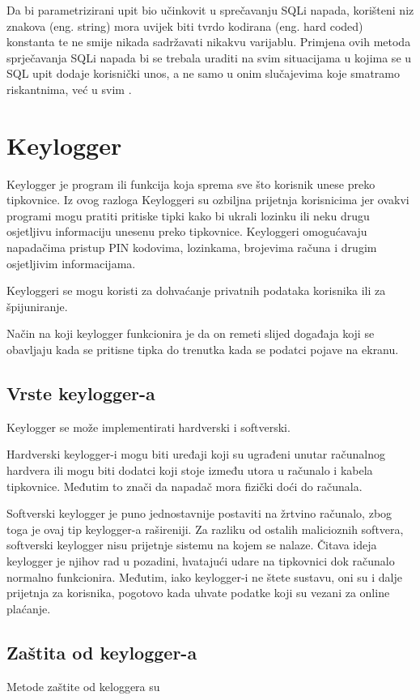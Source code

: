 \documentclass[12pt, oneside, onecolumn]{book}
\begin{document}
{Da bi parametrizirani upit bio učinkovit u sprečavanju SQLi napada, korišteni niz znakova (eng. string) mora uvijek biti tvrdo kodirana (eng. hard coded) konstanta te ne smije nikada sadržavati nikakvu varijablu. Primjena ovih metoda sprječavanja SQLi napada bi se trebala uraditi na svim situacijama u kojima se u SQL upit dodaje korisnički unos, a ne samo u onim slučajevima koje smatramo riskantnima, već u svim \cite{sitesqli}.

\section{Keylogger}
Keylogger je program ili funkcija koja sprema sve što korisnik unese preko tipkovnice. Iz ovog razloga Keyloggeri su ozbiljna prijetnja korisnicima jer ovakvi programi mogu pratiti pritiske tipki kako bi ukrali lozinku ili neku drugu osjetljivu informaciju unesenu preko tipkovnice. Keyloggeri omogućavaju napadačima pristup PIN kodovima, lozinkama, brojevima računa i drugim osjetljivim informacijama.

Keyloggeri se mogu koristi za dohvaćanje privatnih podataka korisnika ili za špijuniranje.

Način na koji keylogger funkcionira je da on remeti slijed događaja koji se obavljaju kada se pritisne tipka do trenutka kada se podatci pojave na ekranu\cite{key}.

\subsection{Vrste keylogger-a}

Keylogger se može implementirati hardverski i softverski. 

Hardverski keylogger-i mogu biti uređaji koji su ugrađeni unutar računalnog hardvera ili mogu biti dodatci koji stoje između utora u računalo i kabela tipkovnice. Međutim to znači da napadač mora fizički doći do računala.

Softverski keylogger je puno jednostavnije postaviti na žrtvino računalo, zbog toga je ovaj tip keylogger-a rašireniji. Za razliku od ostalih malicioznih softvera, softverski keylogger nisu prijetnje sistemu na kojem se nalaze. Čitava ideja keylogger je njihov rad u pozadini, hvatajući udare na tipkovnici dok računalo normalno funkcionira. Međutim, iako keylogger-i ne štete sustavu, oni su i dalje prijetnja za korisnika, pogotovo kada uhvate podatke koji su vezani za online plaćanje.

\subsection{Zaštita od keylogger-a}
Metode zaštite od keloggera su \cite{key2}

}
\end{document}
